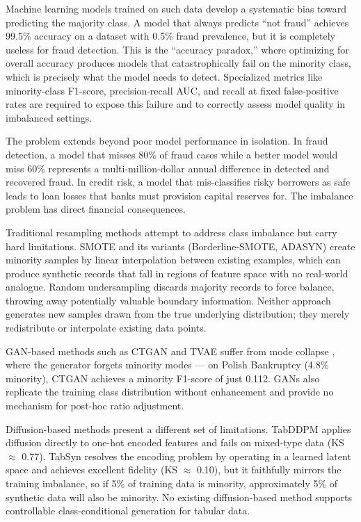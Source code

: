 Machine learning models trained on such data develop a systematic bias toward predicting the majority class. A model that always predicts ``not fraud'' achieves 99.5\% accuracy on a dataset with 0.5\% fraud prevalence, but it is completely useless for fraud detection. This is the ``accuracy paradox,'' where optimizing for overall accuracy produces models that catastrophically fail on the minority class, which is precisely what the model needs to detect. Specialized metrics like minority-class F1-score, precision-recall AUC, and recall at fixed false-positive rates are required to expose this failure and to correctly assess model quality in imbalanced settings.

The problem extends beyond poor model performance in isolation. In fraud detection, a model that misses 80\% of fraud cases while a better model would miss 60\% represents a multi-million-dollar annual difference in detected and recovered fraud. In credit risk, a model that mis-classifies risky borrowers as safe leads to loan losses that banks must provision capital reserves for. The imbalance problem has direct financial consequences.

Traditional resampling methods attempt to address class imbalance but carry hard limitations. SMOTE \cite{chawla2002smote} and its variants (Borderline-SMOTE, ADASYN) create minority samples by linear interpolation between existing examples, which can produce synthetic records that fall in regions of feature space with no real-world analogue. Random undersampling discards majority records to force balance, throwing away potentially valuable boundary information. Neither approach generates new samples drawn from the true underlying distribution; they merely redistribute or interpolate existing data points.

GAN-based methods such as CTGAN and TVAE suffer from mode collapse \cite{salimans2016improved}, where the generator forgets minority modes — on Polish Bankruptcy (4.8\% minority), CTGAN achieves a minority F1-score of just 0.112. GANs also replicate the training class distribution without enhancement and provide no mechanism for post-hoc ratio adjustment.

Diffusion-based methods present a different set of limitations. TabDDPM \cite{kotelnikov2023tabddpm} applies diffusion directly to one-hot encoded features and fails on mixed-type data (KS $\approx$ 0.77). TabSyn \cite{zhang2024tabsyn} resolves the encoding problem by operating in a learned latent space and achieves excellent fidelity (KS $\approx$ 0.10), but it faithfully mirrors the training imbalance, so if 5\% of training data is minority, approximately 5\% of synthetic data will also be minority. No existing diffusion-based method supports controllable class-conditional generation for tabular data.


